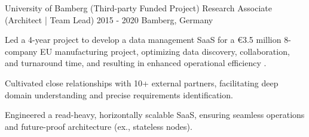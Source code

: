 {}


\begin{cventries}



  \cventry
    {University of Bamberg (Third-party Funded Project)} %
    {Research Associate (Architect | Team Lead)} %
    {2015 - 2020} %
    {Bamberg, Germany} %
    {
      \begin{cvitems} %
		\item {Led a 4-year project to develop a data management SaaS for a €3.5 million 8-company EU manufacturing project, optimizing data discovery, collaboration, and turnaround time, and resulting in enhanced operational efficiency .}
		\item {Cultivated close relationships with 10+ external partners, facilitating deep domain understanding and precise requirements identification.}
		\item {Engineered a read-heavy, horizontally scalable SaaS, ensuring seamless operations and future-proof architecture (ex., stateless nodes).}
      \end{cvitems}
    }





\end{cventries}
